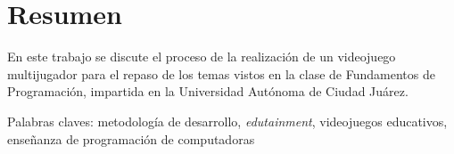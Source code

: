 \chapter*{Resumen}



En este trabajo se discute el proceso de la realización de un videojuego multijugador para el repaso de los temas vistos en la clase de Fundamentos de Programación, impartida en la Universidad Autónoma de Ciudad Juárez. 

Palabras claves: metodología de desarrollo, \textit{edutainment}, videojuegos educativos, enseñanza de programación de computadoras

